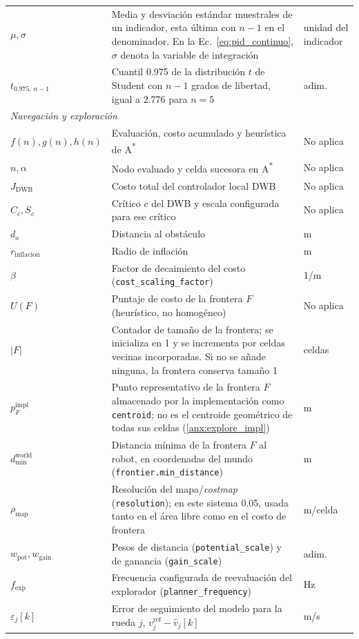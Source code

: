 \begin{appendices}
{\begin{longtable}{p{2.7cm} p{8.5cm} p{2.2cm}}
$\mu,\sigma$ & Media y desviación estándar muestrales de un indicador, esta última con $n-1$ en el denominador. En la Ec.~\eqref{eq:pid_continuo}, $\sigma$ denota la variable de integración & unidad del indicador \\
$t_{0.975,\,n-1}$ & Cuantil 0.975 de la distribución $t$ de Student con $n-1$ grados de libertad, igual a 2.776 para $n=5$ & adim. \\
\multicolumn{3}{l}{\textit{Navegación y exploración}}\\
$f(n),g(n),h(n)$ & Evaluación, costo acumulado y heurística de A\textsuperscript{*} & No aplica \\
$n,\alpha$ & Nodo evaluado y celda sucesora en A\textsuperscript{*} & No aplica \\
$J_{\mathrm{DWB}}$ & Costo total del controlador local DWB & No aplica \\
$C_c,S_c$ & Crítico $c$ del DWB y escala configurada para ese crítico & No aplica \\
$d_o$ & Distancia al obstáculo & m \\
$r_{\mathrm{inflacion}}$ & Radio de inflación & m \\
$\beta$ & Factor de decaimiento del costo (\texttt{cost\_scaling\_factor}) & 1/m \\
$U(F)$ & Puntaje de costo de la frontera $F$ (heurístico, no homogéneo) & No aplica \\
$|F|$ & Contador de tamaño de la frontera; se inicializa en 1 y se incrementa por celdas vecinas incorporadas. Si no se añade ninguna, la frontera conserva tamaño 1 & celdas \\
$p_F^{\mathrm{impl}}$ & Punto representativo de la frontera $F$ almacenado por la implementación como \texttt{centroid}; no es el centroide geométrico de todas sus celdas (\ref{anx:explore_impl}) & m \\
$d_{\mathrm{min}}^{\mathrm{world}}$ & Distancia mínima de la frontera $F$ al robot, en coordenadas del mundo (\texttt{frontier.min\_distance}) & m \\
$\rho_{\mathrm{map}}$ & Resolución del mapa/\textit{costmap} (\texttt{resolution}); en este sistema 0.05, usada tanto en el área libre como en el costo de frontera & m/celda \\
$w_{\mathrm{pot}},w_{\mathrm{gain}}$ & Pesos de distancia (\texttt{potential\_scale}) y de ganancia (\texttt{gain\_scale}) & adim. \\
$f_{\mathrm{exp}}$ & Frecuencia configurada de reevaluación del explorador (\texttt{planner\_frequency}) & Hz \\
$\varepsilon_j[k]$ & Error de seguimiento del modelo para la rueda $j$,
$v_j^{\mathrm{ref}}-\hat{v}_j[k]$ & m/s \\
\end{longtable}
}

\end{appendices}
